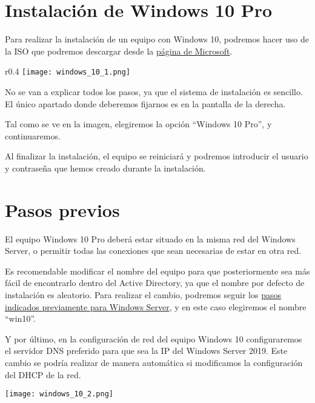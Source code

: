 \section{Instalación de Windows 10 Pro}
Para realizar la instalación de un equipo con Windows 10, podremos hacer uso de la ISO que podremos descargar desde la \href{https://www.microsoft.com/es-es/software-download/windows10ISO}{página de Microsoft}.

\begin{wrapfigure}{r}{0.4\linewidth}
    \centering
    \vspace{-10pt}
    \texttt{[image: windows\_10\_1.png]}
    \vspace{-40pt}
\end{wrapfigure}


No se van a explicar todos los pasos, ya que el sistema de instalación es sencillo. El único apartado donde deberemos fijarnos es en la pantalla de la derecha.

Tal como se ve en la imagen, elegiremos la opción “Windows 10 Pro”, y continuaremos.

Al finalizar la instalación, el equipo se reiniciará y podremos introducir el usuario y contraseña que hemos creado durante la instalación.


\hypertarget{pasos_previos_windows_cliente}{}
\section{Pasos previos}
El equipo Windows 10 Pro deberá estar situado en la misma red del Windows Server, o permitir todas las conexiones que sean necesarias de estar en otra red.

Es recomendable modificar el nombre del equipo para que posteriormente sea más fácil de encontrarlo dentro del Active Directory, ya que el nombre por defecto de instalación es aleatorio. Para realizar el cambio, podremos seguir los \hyperlink{cambiar_nombre_equipo}{pasos indicados previamente para Windows Server}, y en este caso elegiremos el nombre “win10”.

Y por último, en la configuración de red del equipo Windows 10 configuraremos el servidor DNS preferido para que sea la IP del Windows Server 2019. Este cambio se podría realizar de manera automática si modificamos la configuración del DHCP de la red.

\begin{center}
    \texttt{[image: windows\_10\_2.png]}
\end{center}

